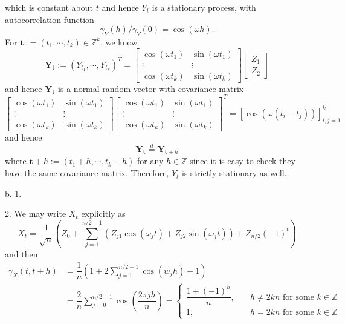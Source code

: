 \documentclass[lang=en,11pt,a4paper,citestyle =authoryear]{elegantpaper}
\newcommand{\Z}{\mathbb{Z}}
\begin{document}
which is constant about $t$ and hence $Y_t$ is a stationary process, with autocorrelation function
\[
\gamma_Y(h)/\gamma_Y(0) = \cos(\omega h).
\]
For $\mathbf{t} : =(t_1,\cdots,t_k) \in \Z^k$, we know
\[
\mathbf{Y}_{\mathbf{t}} :=(Y_{t_1},\cdots,Y_{t_k})^T = \begin{bmatrix}
    \cos(\omega t_1) & \sin(\omega t_1) \\
    \vdots & \vdots \\
    \cos(\omega t_k) & \sin(\omega t_k)
\end{bmatrix}\begin{bmatrix}
    Z_1 \\
    Z_2
\end{bmatrix}
\]
and hence $\mathbf{Y}_{\mathbf{t}}$ is a normal random vector with covariance matrix
\[
\begin{bmatrix}
    \cos(\omega t_1) & \sin(\omega t_1) \\
    \vdots & \vdots \\
    \cos(\omega t_k) & \sin(\omega t_k)
\end{bmatrix}\begin{bmatrix}
    \cos(\omega t_1) & \sin(\omega t_1) \\
    \vdots & \vdots \\
    \cos(\omega t_k) & \sin(\omega t_k)
\end{bmatrix}^T = [\cos (\omega(t_i-t_j))]_{i,j = 1} ^k
\]
and hence
\[\mathbf{Y}_{\mathbf{t}} \overset{d}{=} \mathbf{Y}_{\mathbf{t}+h} \]
where $\mathbf{t}+h:=(t_1+h,\cdots,t_k+h)$ for any $h\in\Z$ since it is easy to check they have the same covariance matrix. Therefore, $Y_t$ is strictly stationary as well.\par
b. 1. \par
2. We may write $X_t$ explicitly as
\[
X_t = \dfrac{1}{\sqrt{n}}\left(Z_0 + \sum\limits_{j=1}^{n/2-1}(Z_{j1}\cos(\omega_jt)+Z_{j2}\sin(\omega_jt)) + Z_{n/2}(-1)^t\right)
\]
and then
\[
\begin{aligned}
\gamma_X(t,t+h) &= \dfrac{1}{n}(1 + 2\sum\limits_{j=1}^{n/2-1}\cos(w_jh) + 1) \\ &= \dfrac{2}{n}\sum\limits_{j=0}^{n/2-1}\cos\left(\dfrac{2\pi jh}{n}\right) = \begin{cases}
    \dfrac{1+(-1)^h}{n},\quad &h \neq 2kn\text{ for some }k\in\Z \\
    1,& h = 2kn\text{ for some }k\in\Z
\end{cases}    
\end{aligned}
\]
\par 
\vspace{0.5em}

\addappheadtotoc
\end{document}
